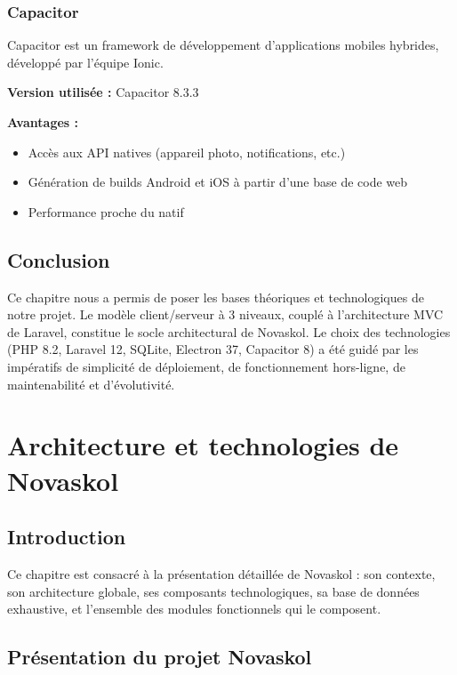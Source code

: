 \documentclass[12pt,a4paper,twoside]{report}
\begin{document}
\subsection{Capacitor}

Capacitor est un framework de développement d'applications mobiles hybrides, développé par l'équipe Ionic.

\textbf{Version utilisée :} Capacitor 8.3.3

\textbf{Avantages :}
\begin{itemize}
    \item Accès aux API natives (appareil photo, notifications, etc.)
    \item Génération de builds Android et iOS à partir d'une base de code web
    \item Performance proche du natif
\end{itemize}

\section{Conclusion}

Ce chapitre nous a permis de poser les bases théoriques et technologiques de notre projet. Le modèle client/serveur à 3 niveaux, couplé à l'architecture MVC de Laravel, constitue le socle architectural de Novaskol. Le choix des technologies (PHP 8.2, Laravel 12, SQLite, Electron 37, Capacitor 8) a été guidé par les impératifs de simplicité de déploiement, de fonctionnement hors-ligne, de maintenabilité et d'évolutivité.

\chapter{Architecture et technologies de Novaskol}

\section{Introduction}

Ce chapitre est consacré à la présentation détaillée de Novaskol : son contexte, son architecture globale, ses composants technologiques, sa base de données exhaustive, et l'ensemble des modules fonctionnels qui le composent.

\section{Présentation du projet Novaskol}
\end{document}
